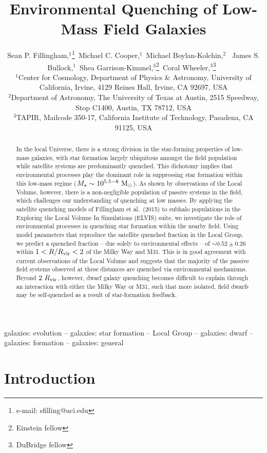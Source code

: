 \documentclass[usenatbib]{mnras}
\title[Quenched Dwarfs Splish-Splashing in the Field]
{Environmental Quenching of Low-Mass Field Galaxies}
\author[Fillingham et al.]
{Sean P. Fillingham,$^1$\thanks{$\!\!$e-mail: sfilling@uci.edu}\ 
Michael C. Cooper,$^1$\ 
Michael Boylan-Kolchin,$^2$\ 
\newauthor
James S. Bullock,$^1$\ 
Shea Garrison-Kimmel,$^3$\thanks{$\!\!$Einstein fellow}\ 
Coral Wheeler,$^3$\thanks{$\!\!$DuBridge fellow}\ 
%
\\
$\!\!^1$Center for Cosmology, Department of Physics \& Astronomy,
University of California, Irvine, 4129 Reines Hall, Irvine, CA 92697, USA \\
$\!\!^2$Department of Astronomy, The University of Texas at Austin,
2515 Speedway, Stop C1400, Austin, TX 78712, USA \\
$\!\!^3$TAPIR, Mailcode 350-17, California Institute of Technology,
Pasadena, CA 91125, USA
}
\newcommand{\rvir}{R_{\rm vir}}
\newcommand{\mstar}{{M}_{\star}}
\newcommand{\msun}{{\rm M}_{\odot}}
\begin{document}
\pagerange{\pageref{firstpage}--\pageref{lastpage}} 

\maketitle

\label{firstpage}
\begin{abstract}
In the local Universe, there is a strong division in the star-forming
properties of low-mass galaxies, with star formation largely
ubiquitous amongst the field population while satellite systems are
predominantly quenched. 
%
This dichotomy implies that environmental processes play the dominant
role in suppressing star formation within this low-mass regime ($
\mstar \sim 10^{5.5-8}~\msun$). 
%
As shown by observations of the Local Volume, however, there is a
non-negligible population of passive systems in the field, which
challenges our understanding of quenching at low masses. 
%
By applying the satellite quenching models of Fillingham et al.~(2015)
to subhalo populations in the Exploring the Local Volume In
Simulations (ELVIS) suite, we investigate the role of environmental
processes in quenching star formation within the nearby field.
%
Using model parameters that reproduce the satellite quenched fraction
in the Local Group, we predict a quenched fraction -- due solely to
environmental effects -- of $\sim 0.52 \pm 0.26$ within $1< R/R_{\rm
  vir} < 2$ of the Milky Way and M31. 
This is in good agreement with current observations of the Local
Volume and suggests that the majority of the passive field systems
observed at these distances are quenched via environmental
mechanisms. 
%
Beyond $2~\rvir$, however, dwarf galaxy quenching becomes difficult to
explain through an interaction with either the Milky Way or M31, such
that more isolated, field dwarfs may be self-quenched as a result of
star-formation feedback. 

\end{abstract}



\begin{keywords}
  galaxies: evolution -- galaxies: star formation -- Local Group --
  galaxies: dwarf -- galaxies: formation -- galaxies: general
\end{keywords}



\section{Introduction}
\label{sec:intro} 
\end{document}

